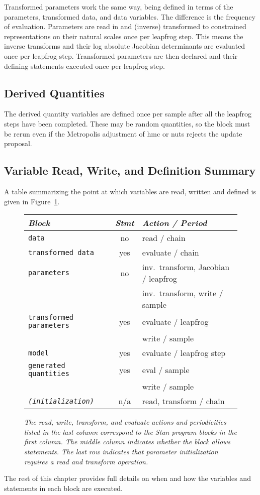 \documentclass[10pt]{report}
\newcommand{\Stan}{Stan\xspace}
\newcommand{\acronym}[1]{{\sc #1}\xspace}
\newcommand{\HMC}{\acronym{hmc}}
\newcommand{\NUTS}{\acronym{nuts}}
\newcommand{\code}[1]{{\tt #1}}
\newcommand{\reffigure}[1]{Figure~\ref{#1.figure}}
\begin{document}
Transformed parameters work the same way, being defined in terms of
the parameters, transformed data, and data variables.  The difference
is the frequency of evaluation.  Parameters are read in and (inverse)
transformed to constrained representations on their natural scales
once per leapfrog step.  This means the inverse transforms and their
log absolute Jacobian determinants are evaluated once per leapfrog
step.  Transformed parameters are then declared and their defining
statements executed once per leapfrog step.

\subsection{Derived Quantities}

The derived quantity variables are defined once per sample after all
the leapfrog steps have been completed.  These may be random
quantities, so the block must be rerun even if the Metropolis
adjustment of \HMC or \NUTS rejects the update proposal.  


\subsection{Variable Read, Write, and Definition Summary}

A table summarizing the point at which variables are read, written and
defined is given in \reffigure{block-actions}.
%
\begin{figure}
\begin{center}
\begin{tabular}{l|c|l}
{\it Block} & {\it Stmt} & {\it Action / Period} 
\\\hline\hline
\code{data} & no & read / chain  
\\
\code{transformed data} & yes & evaluate / chain  
\\ \hline
\code{parameters} & no & inv.\ transform, Jacobian / leapfrog  \\
& & inv.\ transform, write / sample 
\\[3pt]
\code{transformed parameters} & yes & evaluate / leapfrog \\
& & write / sample 
\\\hline
\code{model} & yes & evaluate / leapfrog step 
\\\hline
\code{generated quantities} & yes & eval / sample \\
& & write / sample
\\\hline\hline
\code{\slshape (initialization)} & n/a & read, transform / chain
\end{tabular}
\end{center}
\caption{\it The read, write, transform, and evaluate actions and
  periodicities listed in the last column correspond to the \Stan
  program blocks in the first column.  The middle column indicates
  whether the block allows statements.  The last row indicates that 
  parameter initialization requires a read and transform operation.}
\label{block-actions.figure}
\end{figure}
%
The rest of this chapter provides full details on when and how the
variables and statements in each block are executed.
\end{document}
